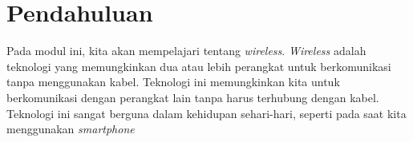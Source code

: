 \section*{Pendahuluan}


Pada modul ini, kita akan mempelajari tentang \textit{wireless}. \textit{Wireless} adalah teknologi yang memungkinkan dua atau lebih perangkat untuk berkomunikasi tanpa menggunakan kabel. Teknologi ini memungkinkan kita untuk berkomunikasi dengan perangkat lain tanpa harus terhubung dengan kabel. Teknologi ini sangat berguna dalam kehidupan sehari-hari, seperti pada saat kita menggunakan \textit{smartphone}